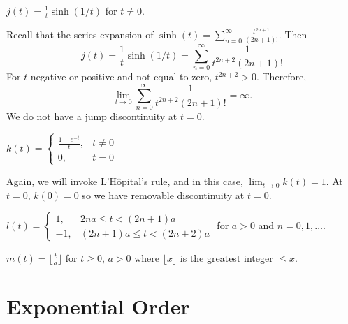 \begin{exercise}
  \(j(t) = \frac{1}{t}\sinh(1/t)\) for \(t\neq 0\).
  \par\smallskip
  Recall that the series expansion of
  \(\sinh(t) = \sum_{n = 0}^{\infty}\frac{t^{2n + 1}}{(2n + 1)!}\).
  Then
  \[
  j(t) = \frac{1}{t}\sinh(1/t) =
  \sum_{n = 0}^{\infty}\frac{1}{t^{2n + 2}(2n + 1)!}
  \]
  For \(t\) negative or positive and not equal to zero, \(t^{2n + 2} > 0\).
  Therefore,
  \[
  \lim_{t\to 0}\sum_{n = 0}^{\infty}\frac{1}{t^{2n + 2}(2n + 1)!} = \infty.
  \]
  We do not have a jump discontinuity at \(t = 0\).
\item
  \(k(t) =
  \begin{cases}
    \frac{1 - e^{-t}}{t}, & t\neq 0\\
    0, & t = 0
  \end{cases}\)
  \par\smallskip
  Again, we will invoke L'H\^{o}pital's rule, and in this case,
  \(\lim_{t\to 0}k(t) = 1\).
  At \(t = 0\), \(k(0) = 0\) so we have removable discontinuity at \(t = 0\).
\item
  \(l(t) =
  \begin{cases}
    1, & 2na\leq t < (2n + 1)a\\
    -1, & (2n + 1)a\leq t < (2n + 2)a
  \end{cases}\)
  for \(a > 0\) and \(n = 0,1,\ldots\).
  \par\smallskip
\item
  \(m(t) = \bigl\lfloor\frac{t}{a}\bigr\rfloor\) for \(t\geq 0\), \(a > 0\)
  where \(\lfloor x\rfloor\) is the greatest integer \(\leq x\). 
\end{exercise}

\section{Exponential Order}

